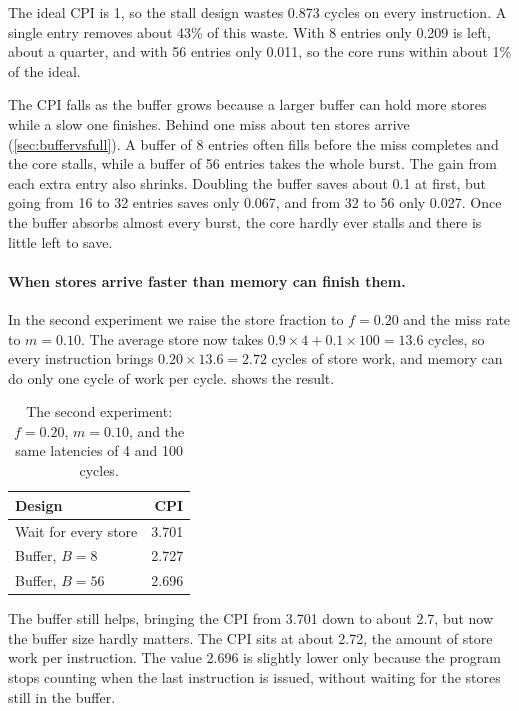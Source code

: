 The ideal CPI is 1, so the stall design wastes 0.873 cycles on every instruction. A single entry removes about 43\% of this waste. With 8 entries only 0.209 is left, about a quarter, and with 56 entries only 0.011, so the core runs within about 1\% of the ideal.

The CPI falls as the buffer grows because a larger buffer can hold more stores while a slow one finishes. Behind one miss about ten stores arrive (\cref{sec:buffervsfull}). A buffer of 8 entries often fills before the miss completes and the core stalls, while a buffer of 56 entries takes the whole burst. The gain from each extra entry also shrinks. Doubling the buffer saves about 0.1 at first, but going from 16 to 32 entries saves only 0.067, and from 32 to 56 only 0.027. Once the buffer absorbs almost every burst, the core hardly ever stalls and there is little left to save.

\paragraph{When stores arrive faster than memory can finish them.} In the second experiment we raise the store fraction to $f = 0.20$ and the miss rate to $m = 0.10$. The average store now takes $0.9 \times 4 + 0.1 \times 100 = 13.6$ cycles, so every instruction brings $0.20 \times 13.6 = 2.72$ cycles of store work, and memory can do only one cycle of work per cycle.  shows the result.

\begin{table}[!htbp]
\centering\small
\caption{The second experiment: $f = 0.20$, $m = 0.10$, and the same latencies of 4 and 100 cycles.}
\label{tab:cpi2}
\begin{tabular}{@{}lr@{}}
\toprule
Design & CPI\\
\midrule
Wait for every store & 3.701\\
Buffer, $B = 8$ & 2.727\\
Buffer, $B = 56$ & 2.696\\
\bottomrule
\end{tabular}
\end{table}

The buffer still helps, bringing the CPI from 3.701 down to about 2.7, but now the buffer size hardly matters. The CPI sits at about 2.72, the amount of store work per instruction. The value 2.696 is slightly lower only because the program stops counting when the last instruction is issued, without waiting for the stores still in the buffer.

